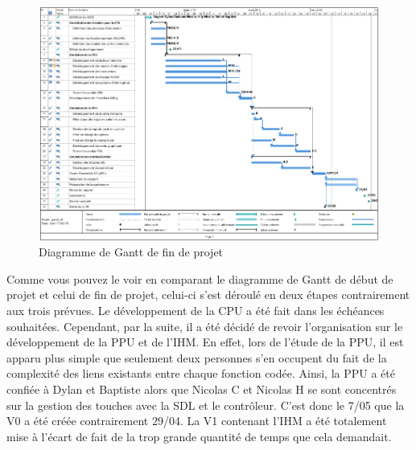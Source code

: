 \begin{figure}[h]
  \centering
   \includegraphics[scale=0.45]{GantV2.png}
   \caption{\label{étiquette} Diagramme de Gantt de fin de projet}
\end{figure}

Comme vous pouvez le voir en comparant le diagramme de Gantt de début de projet et celui de fin de projet, celui-ci s'est déroulé en deux étapes contrairement aux trois prévues. Le développement de la CPU a été fait dans les échéances souhaitées. Cependant, par la suite, il a été décidé de revoir l'organisation sur le développement de la PPU et de l'IHM. En effet, lors de l'étude de la PPU, il est apparu plus simple que seulement deux personnes s'en occupent du fait de la complexité des liens existants entre chaque fonction codée. Ainsi, la PPU a été confiée à Dylan et Baptiste alors que Nicolas C et Nicolas H se sont concentrés sur la gestion des touches avec la SDL et le contrôleur. C'est donc le 7/05 que la V0 a été créée contrairement 29/04. La V1 contenant l'IHM a été totalement mise à l'écart de fait de la trop grande quantité de temps que cela demandait.
